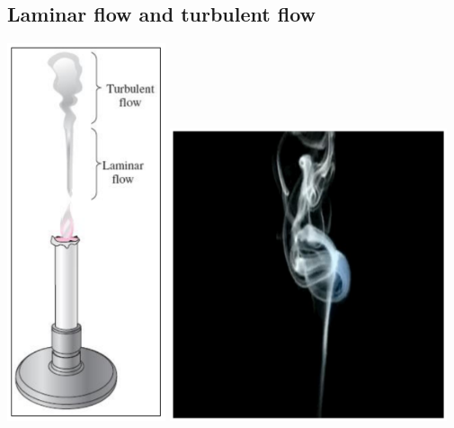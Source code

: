 \documentclass[11pt]{article}
\begin{document}
\subsection{Laminar flow and turbulent flow}
\label{sec:orgd5c9e52}
\begin{center}
\includegraphics[height=30em]{./images/laminar-and-turbulent-flow-candle-diagram.png}
\includegraphics[width=0.61\textwidth]{./images/laminar-and-turbulent-flow-candle-photo.png}
\end{center}

 \newpage
\end{document}
